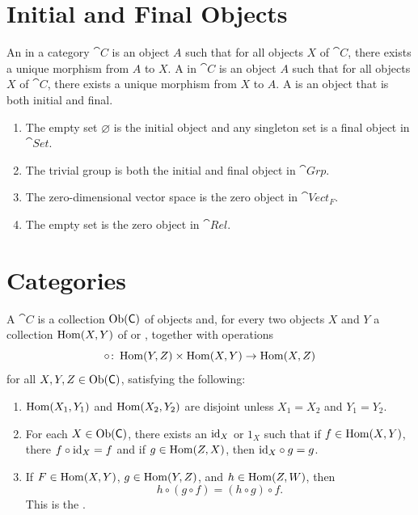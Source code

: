 \section{Initial and Final Objects}\label{sec:Terminals}

An  in a category $\cat C$ is an object $A$ such that for all objects $X$ of $\cat C$, there exists a unique morphism from $A$ to $X$. A  in $\cat C$ is an object $A$ such that for all objects $X$ of $\cat C$, there exists a unique morphism from $X$ to $A$. A  is an object that is both initial and final.

\begin{Example}
\begin{enumerate}
\item The empty set $\varnothing$ is the initial object and any singleton set is a final object in $\cat{Set}$.
\item The trivial group is both the initial and final object in $\cat{Grp}$.
\item The zero-dimensional vector space is the zero object in $\cat{Vect}_F$.
\item The empty set is the zero object in $\cat{Rel}$.
\end{enumerate}
\end{Example}


\section{Categories}\label{sec:Categories}

A  $\cat C$ is a collection $\operatorname{Ob}(\mathsf{C})$ of objects and, for every two objects $X$ and $Y$ a collection $\operatorname{Hom}(X, Y)$ of  or , together with operations
\begin{equation*}
    \circ \colon \operatorname{Hom}(Y, Z) \times \operatorname{Hom}(X, Y) \to \operatorname{Hom}(X, Z)
\end{equation*}
for all $X, Y, Z \in \operatorname{Ob}(\mathsf{C})$, satisfying the following:
\begin{enumerate}[label=(C\arabic*)]
\item $\operatorname{Hom}(X_1, Y_1)$ and $\operatorname{Hom}(X_2, Y_2)$ are disjoint unless $X_1 = X_2$ and $Y_1 = Y_2$.
\item For each $X \in \operatorname{Ob}(\mathsf{C})$, there exists an  $\mathrm{id}_X$ or $1_X$ such that if $f \in \operatorname{Hom}(X, Y)$, there $f \circ \mathrm{id}_X = f$ and if $g \in \operatorname{Hom}(Z, X)$, then $\mathrm{id}_X \circ g = g$.
\item If $F \in \operatorname{Hom}(X, Y)$, $g \in \operatorname{Hom}(Y, Z)$, and $h \in \operatorname{Hom}(Z, W)$, then
\begin{equation*}
    h \circ (g \circ f) = (h \circ g) \circ f.
\end{equation*}
This is the .
\end{enumerate}


